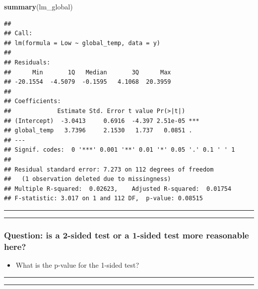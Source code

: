 \documentclass[]{article}
\newenvironment{Shaded}{\begin{snugshade}}{\end{snugshade}}
\newcommand{\KeywordTok}[1]{\textcolor[rgb]{0.13,0.29,0.53}{\textbf{#1}}}
\newcommand{\NormalTok}[1]{#1}
\providecommand{\tightlist}{%
  \setlength{\itemsep}{0pt}\setlength{\parskip}{0pt}}
\begin{document}
\begin{Shaded}
\begin{Highlighting}[]
\KeywordTok{summary}\NormalTok{(lm_global)}
\end{Highlighting}
\end{Shaded}

\begin{verbatim}
## 
## Call:
## lm(formula = Low ~ global_temp, data = y)
## 
## Residuals:
##      Min       1Q   Median       3Q      Max 
## -20.1554  -4.5079  -0.1595   4.1068  20.3959 
## 
## Coefficients:
##             Estimate Std. Error t value Pr(>|t|)    
## (Intercept)  -3.0413     0.6916  -4.397 2.51e-05 ***
## global_temp   3.7396     2.1530   1.737   0.0851 .  
## ---
## Signif. codes:  0 '***' 0.001 '**' 0.01 '*' 0.05 '.' 0.1 ' ' 1
## 
## Residual standard error: 7.273 on 112 degrees of freedom
##   (1 observation deleted due to missingness)
## Multiple R-squared:  0.02623,    Adjusted R-squared:  0.01754 
## F-statistic: 3.017 on 1 and 112 DF,  p-value: 0.08515
\end{verbatim}


\begin{center}\rule{0.5\linewidth}{\linethickness}\end{center}

\begin{center}\rule{0.5\linewidth}{\linethickness}\end{center}

\subsubsection{Question: is a 2-sided test or a 1-sided test more
reasonable
here?}\label{question-is-a-2-sided-test-or-a-1-sided-test-more-reasonable-here}

\begin{itemize}
\tightlist
\item
  What is the p-value for the 1-sided test?
\end{itemize}

\begin{center}\rule{0.5\linewidth}{\linethickness}\end{center}

\begin{center}\rule{0.5\linewidth}{\linethickness}\end{center}
\end{document}
